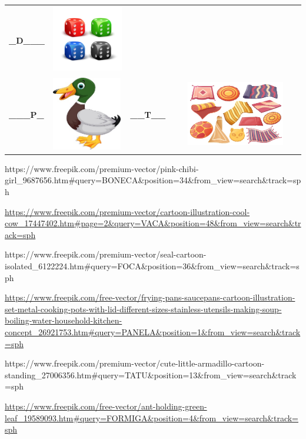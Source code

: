 \begin{longtable}[]{@{}llll@{}}
\textbf{\_D\_\_\_} &
\includegraphics[width=1.23958in,height=1.15833in]{media/image23.jpeg}\tabularnewline
\textbf{\_\_\_P\_} &
\includegraphics[width=1.19722in,height=1.27083in]{media/image24.jpeg} &
\textbf{\_\_T\_\_} &
\includegraphics[width=2.21875in,height=1.11458in]{media/image25.jpeg}\tabularnewline
\bottomrule
\end{longtable}

https://www.freepik.com/premium-vector/pink-chibi-girl\_9687656.htm\#query=BONECA\&position=34\&from\_view=search\&track=sph

\url{https://www.freepik.com/premium-vector/cartoon-illustration-cool-cow_17447402.htm\#page=2\&query=VACA\&position=48\&from_view=search\&track=sph}

https://www.freepik.com/premium-vector/seal-cartoon-isolated\_6122224.htm\#query=FOCA\&position=36\&from\_view=search\&track=sph

\url{https://www.freepik.com/free-vector/frying-pans-saucepans-cartoon-illustration-set-metal-cooking-pots-with-lid-different-sizes-stainless-utensils-making-soup-boiling-water-household-kitchen-concept_26921753.htm\#query=PANELA\&position=1\&from_view=search\&track=sph}

https://www.freepik.com/premium-vector/cute-little-armadillo-cartoon-standing\_27006356.htm\#query=TATU\&position=13\&from\_view=search\&track=sph

\url{https://www.freepik.com/free-vector/ant-holding-green-leaf_19589093.htm\#query=FORMIGA\&position=4\&from_view=search\&track=sph}

